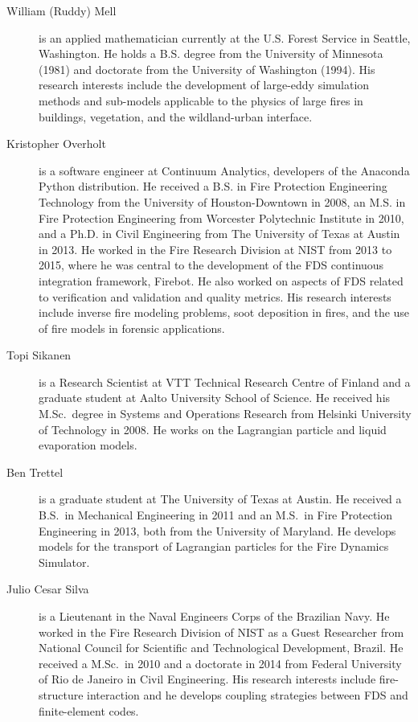 \begin{description}
\item[William (Ruddy) Mell] is an applied mathematician currently at the U.S. Forest Service in Seattle, Washington. He holds a B.S. degree from the University of Minnesota (1981) and doctorate from the University of Washington (1994). His research interests include the development of large-eddy simulation methods and sub-models applicable to the physics of large fires in buildings, vegetation, and the wildland-urban interface.
    
\item[Kristopher Overholt] is a software engineer at Continuum Analytics, developers of the Anaconda Python distribution. He received a B.S. in Fire Protection Engineering Technology from the University of Houston-Downtown in 2008, an M.S. in Fire Protection Engineering from Worcester Polytechnic Institute in 2010, and a Ph.D. in Civil Engineering from The University of Texas at Austin in 2013. He worked in the Fire Research Division at NIST from 2013 to 2015, where he was central to the development of the FDS continuous integration framework, Firebot.  He also worked on aspects of FDS related to verification and validation and quality metrics. His research interests include inverse fire modeling problems, soot deposition in fires, and the use of fire models in forensic applications.

\item[Topi Sikanen] is a Research Scientist at VTT Technical Research Centre of Finland and a graduate student at Aalto University School of Science. He received his M.Sc.~degree in Systems and Operations Research from Helsinki University of Technology in 2008. He works on the Lagrangian particle and liquid evaporation models.

\item[Ben Trettel] is a graduate student at The University of Texas at Austin. He received a B.S.~in Mechanical Engineering in 2011 and an M.S.~in Fire Protection Engineering in 2013, both from the University of Maryland. He develops models for the transport of Lagrangian particles for the Fire Dynamics Simulator.

\item[Julio Cesar Silva] is a Lieutenant in the Naval Engineers Corps of the Brazilian Navy. He worked in the Fire Research Division of NIST as a Guest Researcher from National Council for Scientific and Technological Development, Brazil. He received a M.Sc.~in 2010 and a doctorate in 2014 from Federal University of Rio de Janeiro in Civil Engineering. His research interests include fire-structure interaction and he develops coupling strategies between FDS and finite-element codes.


\end{description}
